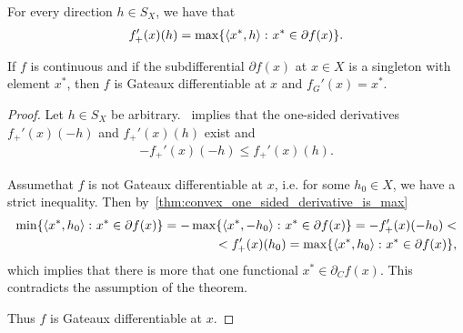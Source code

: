 \begin{proposition}
  \label{thm:convex_one_sided_derivative_is_max}
  For every direction $h \in S_X$, we have that
  \begin{align*}
    f_+'(x)(h) = \max\{ \left\langle x^*, h \right\rangle \colon x^* \in \partial f(x) \}.
  \end{align*}
\end{proposition}

\begin{theorem}\label{thm:singleton_subdifferential_implies_gateaux}
  If $f$ is continuous and if the subdifferential $\partial f(x)$ at $x \in X$ is a singleton with element $x^*$, then $f$ is Gateaux differentiable at $x$ and $f_G'(x) = x^*$.
\end{theorem}
\begin{proof}
  Let $h \in S_X$ be arbitrary.~ implies that the one-sided derivatives $f_+'(x)(-h)$ and $f_+'(x)(h)$ exist and
  \begin{align*}
    -f_+'(x)(-h) \leq f_+'(x)(h).
  \end{align*}

  Assume\LEM that $f$ is not Gateaux differentiable at $x$, i.e. for some $h_0 \in X$, we have a strict inequality. Then by~\cref{thm:convex_one_sided_derivative_is_max}
  \begin{align*}
    \min\{ \left\langle x^*, h_0 \right\rangle \colon x^* \in \partial f(x) \}
    =
    -\max\{ \left\langle x^*, -h_0 \right\rangle \colon x^* \in \partial f(x) \}
    =
    -f_+'(x)(-h_0)
    < \\ <
    f_+'(x)(h_0)
    =
    \max\{ \left\langle x^*, h_0 \right\rangle \colon x^* \in \partial f(x) \},
  \end{align*}
  which implies that there is more that one functional $x^* \in \partial_C f(x)$. This contradicts the assumption of the theorem.

  Thus $f$ is Gateaux differentiable at $x$.
\end{proof}

